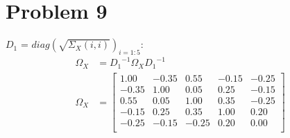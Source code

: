 \documentclass{article}
\begin{document}
\section*{Problem 9}
\(D_{1}\) = \(diag(\sqrt{\Sigma_X(i,i)})_{i=1:5}\):
\begin{equation*}
\begin{aligned}
\Omega_X &= {D_{1}}^{-1}\Omega_{X}{D_{1}}^{-1} \\
\Omega_X &=
\begin{bmatrix}{}
  1.00 & -0.35 & 0.55 & -0.15 & -0.25 \\ 
  -0.35 & 1.00 & 0.05 & 0.25 & -0.15 \\ 
  0.55 & 0.05 & 1.00 & 0.35 & -0.25 \\ 
  -0.15 & 0.25 & 0.35 & 1.00 & 0.20 \\ 
  -0.25 & -0.15 & -0.25 & 0.20 & 0.00 \\ 
  \end{bmatrix}
\end{aligned}
\end{equation*}
\end{document}

